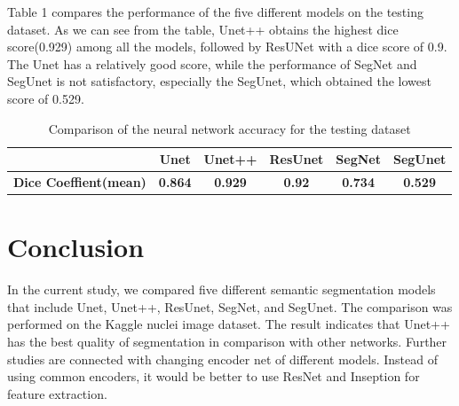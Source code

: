 \documentclass{article}
\begin{document}
Table 1 compares the performance of the five different models on the testing dataset. As we can see from the table, Unet++ obtains the highest dice score(0.929) among all the models, followed by ResUNet with a dice score of 0.9. The Unet has a relatively good score, while the performance of SegNet and SegUnet is not satisfactory, especially the SegUnet, which obtained the lowest score of 0.529.
\begin{table}[H]
    \begin{tabular}{@{}cccccc@{}}
        \toprule
        \textbf{}                     & \textbf{Unet}  & \textbf{Unet++} & \textbf{ResUnet} & \textbf{SegNet} & \textbf{SegUnet} \\ \midrule
        \textbf{Dice Coeffient(mean)} & \textbf{0.864} & \textbf{0.929}  & \textbf{0.92}    & \textbf{0.734}  & \textbf{0.529}   \\ \bottomrule
    \end{tabular}
    \caption{Comparison of the neural network accuracy for the testing dataset}
\end{table}

\section{Conclusion}
In the current study, we compared five different semantic segmentation models that include Unet, Unet++, ResUnet, SegNet, and SegUnet. The comparison was performed on the Kaggle nuclei image dataset. The result indicates that Unet++ has the best quality of segmentation in comparison with other networks. Further studies are connected with changing encoder net of different models. Instead of using common encoders, it would be better to use ResNet and Inseption for feature extraction.


\end{document}
